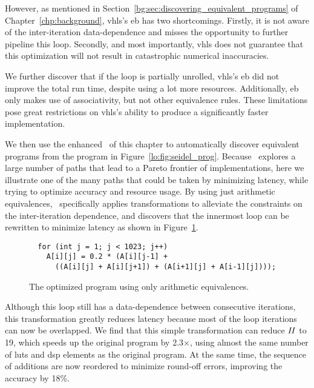 However, as mentioned in Section~\ref{bg:sec:discovering_equivalent_programs}
of Chapter~\ref{chp:background}, \gls{vhls}'s \gls{eb} has two shortcomings.
Firstly, it is not aware of the inter-iteration data-dependence and misses the
opportunity to further pipeline this loop.  Secondly, and most importantly,
\gls{vhls} does not guarantee that this optimization will not result in
catastrophic numerical inaccuracies.

We further discover that if the loop is partially unrolled, \gls{vhls}'s
\gls{eb} did not improve the total run time, despite using a lot more
resources.  Additionally, \gls{eb} only makes use of associativity, but
not other equivalence rules.  These limitations pose great restrictions on
\gls{vhls}'s ability to produce a significantly faster implementation.

We then use the enhanced \soap~of this chapter to automatically discover
equivalent programs from the program in Figure~\ref{lo:fig:seidel_prog}.
Because \soap~explores a large number of paths that lead to a Pareto frontier
of implementations, here we illustrate one of the many paths that could be
taken by minimizing latency, while trying to optimize accuracy and resource
usage.  By using just arithmetic equivalences, \soap~specifically applies
transformations to alleviate the constraints on the inter-iteration dependence,
and discovers that the innermost loop can be rewritten to minimize latency as
shown in Figure~\ref{lo:fig:seidel_prog_2}.

\begin{figure}[ht]
\begin{lstlisting}
  for (int j = 1; j < 1023; j++)
    A[i][j] = 0.2 * (A[i][j-1] +
      ((A[i][j] + A[i][j+1]) + (A[i+1][j] + A[i-1][j])));
\end{lstlisting}
    \caption{The optimized program using only arithmetic equivalences.}
    \label{lo:fig:seidel_prog_2}
\end{figure}

Although this loop still has a data-dependence between consecutive iterations,
this transformation greatly reduces latency because most of the loop iterations
can now be overlapped.  We find that this simple transformation can reduce
$\mathit{II}$ to 19, which speeds up the original program by 2.3$\times$, using almost
the same number of \glspl{lut} and \gls{dsp} elements as the original program.
At the same time, the sequence of additions are now reordered to minimize
round-off errors, improving the accuracy by 18\%.


